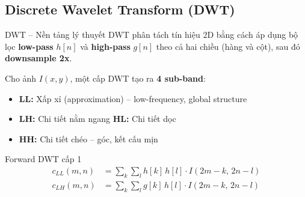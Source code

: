 \documentclass{beamer}
\begin{document}
\subsection{Discrete Wavelet Transform (DWT)}

\begin{frame}{DWT -- Nền tảng lý thuyết}
    \small
    DWT phân tách tín hiệu 2D bằng cách áp dụng bộ lọc \textbf{low-pass} $h[n]$ và \textbf{high-pass} $g[n]$ theo cả hai chiều (hàng và cột), sau đó \textbf{downsample 2x}.

    \vspace{0.15cm}
    Cho ảnh $I(x,y)$, một cấp DWT tạo ra \textbf{4 sub-band}:
    \begin{itemize}\setlength{\itemsep}{1pt}
        \item \textbf{LL:} Xấp xỉ (approximation) -- low-frequency, global structure
        \item \textbf{LH:} Chi tiết nằm ngang \quad \textbf{HL:} Chi tiết dọc
        \item \textbf{HH:} Chi tiết chéo -- góc, kết cấu mịn
    \end{itemize}

    \vspace{0.1cm}
    \begin{block}{Forward DWT cấp 1}
        \begin{align}
            c_{LL}(m,n) &= \sum_k \sum_l h[k]\, h[l] \cdot I(2m-k,\, 2n-l) \nonumber \\
            c_{LH}(m,n) &= \sum_k \sum_l g[k]\, h[l] \cdot I(2m-k,\, 2n-l)
        \end{align}
    \end{block}
\end{frame}
\end{document}
